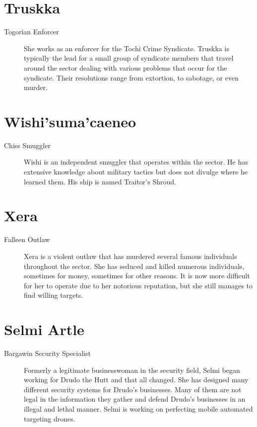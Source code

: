 \documentclass{article}
\begin{document}
\section{Truskka}
\begin{description}
	\item [Togorian \female Enforcer] She works as an enforcer for the Tochi Crime Syndicate. Truskka is typically the lead for a small group of syndicate members that travel around the sector dealing with various problems that occur for the syndicate. Their resolutions range from extortion, to sabotage, or even murder.
\end{description}
\section{Wishi’suma’caeneo}
\begin{description}
	\item [Chiss \male Smuggler] Wishi is an independent smuggler that operates within the sector. He has extensive knowledge about military tactics but does not divulge where he learned them. His ship is named Traitor’s Shroud.
\end{description}
\section{Xera}
\begin{description}
	\item [Falleen \female Outlaw] Xera is a violent outlaw that has murdered several famous individuals throughout the sector. She has seduced and killed numerous individuals, sometimes for money, sometimes for other reasons. It is now more difficult for her to operate due to her notorious reputation, but she still manages to find willing targets.
\end{description}
\section{Selmi Artle}
\begin{description}
	\item [Bargawin \female Security Specialist] Formerly a legitimate businesswoman in the security field, Selmi began working for Drudo the Hutt and that all changed. She has designed many different security systems for Drudo’s businesses. Many of them are not legal in the information they gather and defend Drudo’s businesses in an illegal and lethal manner. Selmi is working on perfecting mobile automated targeting drones.
\end{description}
\end{document}

